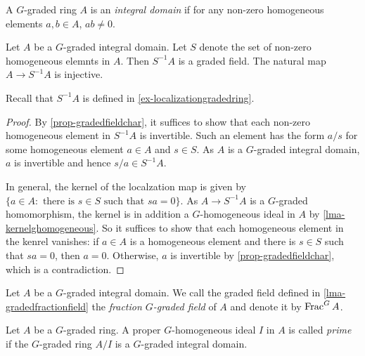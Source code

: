 \begin{definition}
    A $G$-graded ring $A$ is an \emph{integral domain} if for any non-zero homogeneous elements $a,b\in A$, $ab\neq 0$.
\end{definition}
\begin{lemma}\label{lma-gradedfractionfield}
    Let $A$ be a $G$-graded integral domain. Let $S$ denote the set of non-zero homogeneous elemnts in $A$. Then $S^{-1}A$ is a graded field. The natural map $A\rightarrow S^{-1}A$ is injective.
\end{lemma}
Recall that $S^{-1}A$ is defined in \cref{ex-localizationgradedring}.
\begin{proof}
    By \cref{prop-gradedfieldchar}, it suffices to show that each non-zero homogeneous element in $S^{-1}A$ is invertible. Such an element has the form $a/s$ for some homogeneous element $a\in A$ and $s\in S$. As $A$ is a $G$-graded integral domain, $a$ is invertible and hence $s/a\in S^{-1}A$.

    In general, the kernel of the localzation map is given by $\{a\in A: \text{ there is }s\in S\text{ such that }sa=0\}$. As $A\rightarrow S^{-1}A$ is a $G$-graded homomorphism, the kernel is in addition a $G$-homogeneous ideal in $A$ by \cref{lma-kernelghomogeneous}. So it suffices to show that each homogeneous element in the kenrel vanishes: if $a\in A$ is a homogeneous element and there is $s\in S$ such that $sa=0$, then $a=0$. Otherwise, $a$ is invertible by \cref{prop-gradedfieldchar}, which is a contradiction.
\end{proof}
\begin{definition}
    Let $A$ be a $G$-graded integral domain. We call the graded field defined in \cref{lma-gradedfractionfield} the \emph{fraction $G$-graded field} of $A$ and denote it by $\operatorname{Frac}^G A$.
\end{definition}

\begin{definition}
    Let $A$ be a $G$-graded ring. A proper $G$-homogeneous ideal $I$ in $A$ is called \emph{prime} if the $G$-graded ring $A/I$ is a $G$-graded integral domain.
\end{definition}

